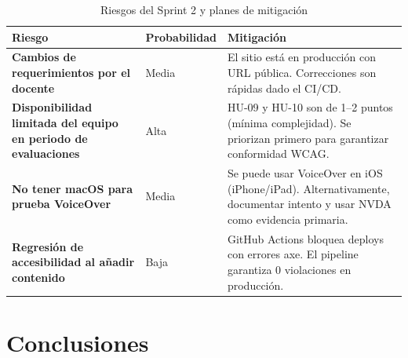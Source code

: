 \documentclass[12pt, a4paper]{article}
\begin{document}
\begin{table}[H]
\centering
\caption{Riesgos del Sprint 2 y planes de mitigación}
\small
\begin{tabular}{@{}>{\bfseries}p{4.5cm} >{\centering\arraybackslash}p{1.8cm} p{7.5cm}@{}}
\toprule
\rowcolor{graylight}
\textbf{Riesgo} & \textbf{Probabilidad} & \textbf{Mitigación} \\
\midrule
Cambios de requerimientos por el docente &
  Media &
  El sitio está en producción con URL pública. Correcciones son rápidas dado el CI/CD. \\[4pt]
Disponibilidad limitada del equipo en periodo de evaluaciones &
  Alta &
  HU-09 y HU-10 son de 1--2 puntos (mínima complejidad). Se priorizan primero para garantizar conformidad WCAG. \\[4pt]
No tener macOS para prueba VoiceOver &
  Media &
  Se puede usar VoiceOver en iOS (iPhone/iPad). Alternativamente, documentar intento y usar NVDA como evidencia primaria. \\[4pt]
Regresión de accesibilidad al añadir contenido &
  Baja &
  GitHub Actions bloquea deploys con errores axe. El pipeline garantiza 0 violaciones en producción. \\
\bottomrule
\end{tabular}
\end{table}

\section{Conclusiones}
\end{document}
